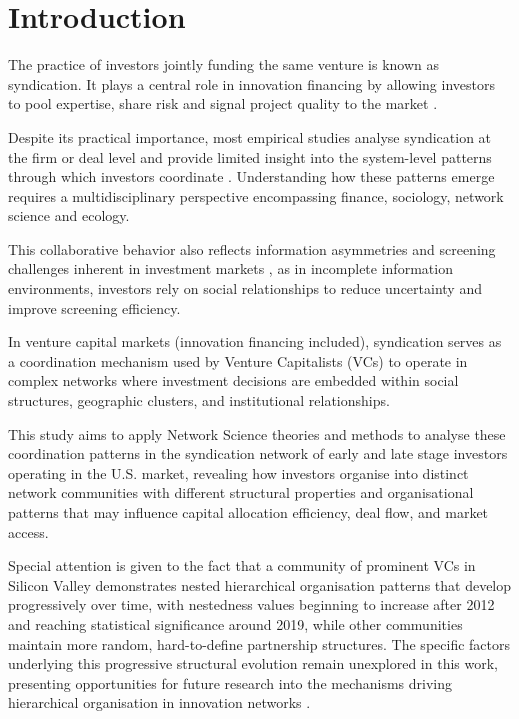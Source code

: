 \section{Introduction}

The practice of investors jointly funding the same venture is known as syndication. It plays a central role in innovation financing by allowing investors to pool expertise, share risk and signal project quality to the market \cite{Lerner1994,Casamatta2007}.  

Despite its practical importance, most empirical studies analyse syndication at the firm or deal level and provide limited insight into the system-level patterns through which investors coordinate \cite{Pruthi2005, Benzouai2021}. Understanding how these patterns emerge requires a multidisciplinary perspective encompassing finance, sociology, network science and ecology.

This collaborative behavior also reflects information asymmetries and screening challenges inherent in investment markets \cite{Lerner1994}, as in incomplete information environments, investors rely on social relationships to reduce uncertainty and improve screening efficiency.

In venture capital markets (innovation financing included), syndication serves as a coordination mechanism used by Venture Capitalists (VCs) to operate in complex networks where investment decisions are embedded within social structures, geographic clusters, and institutional relationships.


This study aims to apply Network Science theories and methods to analyse these coordination patterns in the syndication network of early and late stage investors operating in the U.S. market, revealing how investors organise into distinct network communities with different structural properties and organisational patterns that may influence capital allocation efficiency, deal flow, and market access.

Special attention is given to the fact that a community of prominent VCs in Silicon Valley demonstrates nested hierarchical organisation patterns that develop progressively over time, with nestedness values beginning to increase after 2012 and reaching statistical significance around 2019, while other communities maintain more random, hard-to-define partnership structures. The specific factors underlying this progressive structural evolution remain unexplored in this work, presenting opportunities for future research into the mechanisms driving hierarchical organisation in innovation networks \cite{Mariani2019, Barabasi1999, Scheffer2009}.

